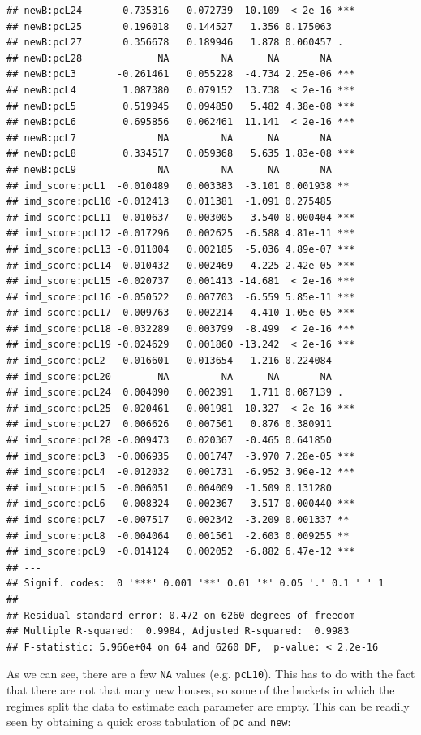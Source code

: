 \documentclass[]{book}
\begin{document}
\begin{verbatim}
## newB:pcL24       0.735316   0.072739  10.109  < 2e-16 ***
## newB:pcL25       0.196018   0.144527   1.356 0.175063    
## newB:pcL27       0.356678   0.189946   1.878 0.060457 .  
## newB:pcL28             NA         NA      NA       NA    
## newB:pcL3       -0.261461   0.055228  -4.734 2.25e-06 ***
## newB:pcL4        1.087380   0.079152  13.738  < 2e-16 ***
## newB:pcL5        0.519945   0.094850   5.482 4.38e-08 ***
## newB:pcL6        0.695856   0.062461  11.141  < 2e-16 ***
## newB:pcL7              NA         NA      NA       NA    
## newB:pcL8        0.334517   0.059368   5.635 1.83e-08 ***
## newB:pcL9              NA         NA      NA       NA    
## imd_score:pcL1  -0.010489   0.003383  -3.101 0.001938 ** 
## imd_score:pcL10 -0.012413   0.011381  -1.091 0.275485    
## imd_score:pcL11 -0.010637   0.003005  -3.540 0.000404 ***
## imd_score:pcL12 -0.017296   0.002625  -6.588 4.81e-11 ***
## imd_score:pcL13 -0.011004   0.002185  -5.036 4.89e-07 ***
## imd_score:pcL14 -0.010432   0.002469  -4.225 2.42e-05 ***
## imd_score:pcL15 -0.020737   0.001413 -14.681  < 2e-16 ***
## imd_score:pcL16 -0.050522   0.007703  -6.559 5.85e-11 ***
## imd_score:pcL17 -0.009763   0.002214  -4.410 1.05e-05 ***
## imd_score:pcL18 -0.032289   0.003799  -8.499  < 2e-16 ***
## imd_score:pcL19 -0.024629   0.001860 -13.242  < 2e-16 ***
## imd_score:pcL2  -0.016601   0.013654  -1.216 0.224084    
## imd_score:pcL20        NA         NA      NA       NA    
## imd_score:pcL24  0.004090   0.002391   1.711 0.087139 .  
## imd_score:pcL25 -0.020461   0.001981 -10.327  < 2e-16 ***
## imd_score:pcL27  0.006626   0.007561   0.876 0.380911    
## imd_score:pcL28 -0.009473   0.020367  -0.465 0.641850    
## imd_score:pcL3  -0.006935   0.001747  -3.970 7.28e-05 ***
## imd_score:pcL4  -0.012032   0.001731  -6.952 3.96e-12 ***
## imd_score:pcL5  -0.006051   0.004009  -1.509 0.131280    
## imd_score:pcL6  -0.008324   0.002367  -3.517 0.000440 ***
## imd_score:pcL7  -0.007517   0.002342  -3.209 0.001337 ** 
## imd_score:pcL8  -0.004064   0.001561  -2.603 0.009255 ** 
## imd_score:pcL9  -0.014124   0.002052  -6.882 6.47e-12 ***
## ---
## Signif. codes:  0 '***' 0.001 '**' 0.01 '*' 0.05 '.' 0.1 ' ' 1
## 
## Residual standard error: 0.472 on 6260 degrees of freedom
## Multiple R-squared:  0.9984, Adjusted R-squared:  0.9983 
## F-statistic: 5.966e+04 on 64 and 6260 DF,  p-value: < 2.2e-16
\end{verbatim}

As we can see, there are a few \texttt{NA} values (e.g. \texttt{pcL10}).
This has to do with the fact that there are not that many new houses, so
some of the buckets in which the regimes split the data to estimate each
parameter are empty. This can be readily seen by obtaining a quick cross
tabulation of \texttt{pc} and \texttt{new}:
\end{document}
